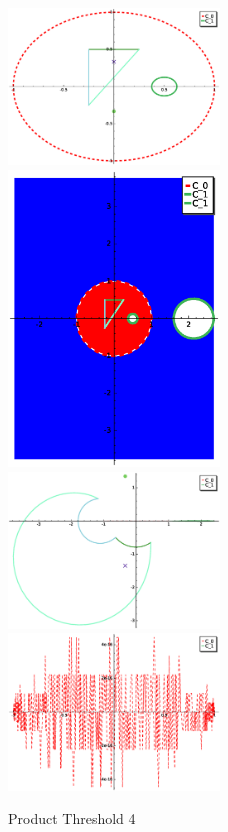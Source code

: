 \documentclass[a4paper,10pt]{article}
\begin{document}
\graphicspath{{./GE1LE2PT4/}}
\begin{figure}
\caption{Product Threshold 4}
\includegraphics[width=0.5\textwidth]{circle_plot.eps}
\includegraphics[width=0.5\textwidth]{Fundamental_domain.eps}
\includegraphics[width=0.5\textwidth]{zedplot.eps}
\includegraphics[width=0.5\textwidth]{zedplot_C0.eps}
\end{figure}
\end{document}
